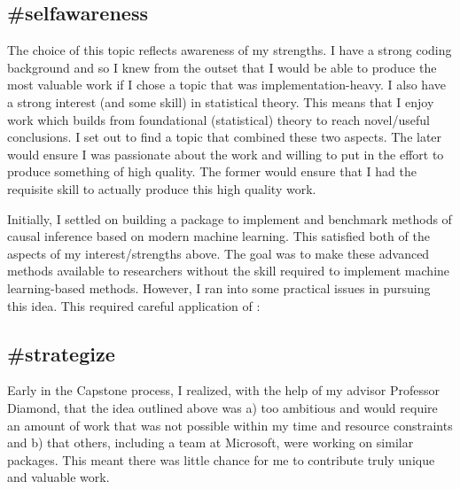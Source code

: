 \documentclass[./main.tex]{subfiles}
\begin{document}

\subsection{\textbf{\#selfawareness}}
\label{hc:selfawareness}

The choice of this topic reflects awareness of my strengths. I have a strong coding background and so I knew from the outset that I would be able to produce the most valuable work if I chose a topic that was implementation-heavy. I also have a strong interest (and some skill) in statistical theory. This means that I enjoy work which builds from foundational (statistical) theory to reach novel/useful conclusions. I set out to find a topic that combined these two aspects. The later would ensure I was passionate about the work and willing to put in the effort to produce something of high quality. The former would ensure that I had the requisite skill to actually produce this high quality work.

\vspace{\baselineskip}

Initially, I settled on building a package to implement and benchmark methods of causal inference based on modern machine learning. This satisfied both of the aspects of my interest/strengths above. The goal was to make these advanced methods available to researchers without the skill required to implement machine learning-based methods. However, I ran into some practical issues in pursuing this idea. This required careful application of :


\subsection{\textbf{\#strategize}}
\label{hc:strategize}

Early in the Capstone process, I realized, with the help of my advisor Professor Diamond, that the idea outlined above was a) too ambitious and would require an amount of work that was not possible within my time and resource constraints and b) that others, including a team at Microsoft, were working on similar packages. This meant there was little chance for me to contribute truly unique and valuable work.

\vspace{\baselineskip}
\end{document}
